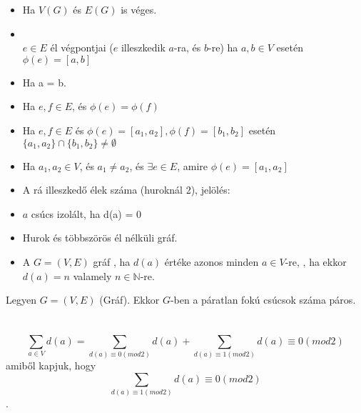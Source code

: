 \begin{frame}

\begin{tcolorbox}[title={Egyéb definíciók}]
\begin{itemize}
\item {} Ha $V(G)$ és $E(G)$ is véges.
\item {}\\
$e \in E$ él végpontjai ($e$ illeszkedik $a$-ra, és $b$-re) ha $a, b \in V$ esetén ${\phi}(e) = [a, b]$
\item {} Ha a = b.
\item {} Ha $e, f \in E$, és ${\phi}(e) = {\phi}(f)$
\item {} Ha $e, f \in E$ és ${\phi}(e) = [a_1, a_2], {\phi}(f) = [b_1, b_2]$ esetén $\{a_1, a_2\} \cap \{b_1, b_2\} \neq \emptyset$
\item {} Ha $a_1, a_2 \in V$, és $a_1 \neq a_2$, és ${\exists}e \in E$, amire ${\phi}(e) = [a_1, a_2]$
\item {} A rá illeszkedő élek száma (huroknál 2), jelölés: 
\item {} $a$ csúcs izolált, ha d(a) = 0
\item {} Hurok és többszörös él nélküli gráf.
\item {} A $G = (V, E)$ gráf , ha $d(a)$ értéke azonos minden $a \in V$-re, , ha ekkor $d(a) = n$ valamely $n \in \mathbb{N}$-re.
\end{itemize}
\end{tcolorbox}

\end{frame}

\begin{frame}

\begin{tcolorbox}[title={Tétel: Fokszám-Élszám}]
Legyen $G = (V, E)$ (Gráf). Ekkor $G$-ben a páratlan fokú csúcsok száma páros.\\
\tcblower
\msmallskip
\underline{}\\
\mmedskip
\\
$$\sum_{a \in V} d(a) = \sum_{d(a) \equiv 0 (mod 2)} d(a) + \sum_{d(a) \equiv 1 (mod 2)} d(a) \equiv 0 (mod 2)$$
amiből kapjuk, hogy $$\sum_{d(a) \equiv 1 (mod 2)} d(a) \equiv 0 (mod 2)$$.

\end{tcolorbox}

\end{frame}

